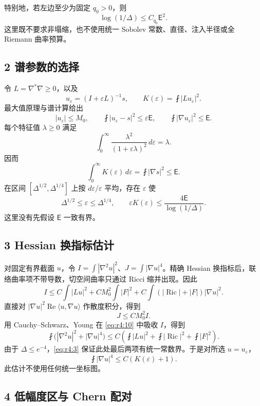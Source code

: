 \documentclass[UTF8,11pt,fontset=none]{ctexart}
\begin{document}
特别地，若左边至少为固定 \(q_0>0\)，则 \[
\boxed{
\log(1/\Delta)\le C_{q_0}\mathsf E^2.
}
\tag{4.6}\label{eq:r4:6}
\] 这里既不要求非塌缩，也不使用统一 Sobolev 常数、直径、注入半径或全 Riemann 曲率预算。

\subsection{2 谱参数的选择}\label{ch4:ux8c31ux53c2ux6570ux7684ux9009ux62e9}

令 \(L=\nabla^*\nabla\ge0\)，以及 \[
u_\varepsilon=(I+\varepsilon L)^{-1}s,
\qquad K(\varepsilon)=\fint|Lu_\varepsilon|^2.
\] 最大值原理与谱计算给出 \[
|u_\varepsilon|\le M_0,
\qquad \fint|u_\varepsilon-s|^2\le\varepsilon\mathsf E,
\qquad \fint|\nabla u_\varepsilon|^2\le\mathsf E.
\tag{4.7}\label{eq:r4:7}
\] 每个特征值 \(\lambda\ge0\) 满足 \[
\int_0^\infty\frac{\lambda^2}{(1+\varepsilon\lambda)^2}\,d\varepsilon=\lambda.
\] 因而 \[
\int_0^\infty K(\varepsilon)\,d\varepsilon
=\fint|\nabla s|^2\le\mathsf E.
\tag{4.8}\label{eq:r4:8}
\] 在区间 \([\Delta^{1/2},\Delta^{1/4}]\) 上按 \(d\varepsilon/\varepsilon\) 平均，存在 \(\varepsilon\) 使 \[
\Delta^{1/2}\le\varepsilon\le\Delta^{1/4},
\qquad
\varepsilon K(\varepsilon)\le
\frac{4\mathsf E}{\log(1/\Delta)}.
\tag{4.9}\label{eq:r4:9}
\] 这里没有先假设 \(\mathsf E\) 一致有界。

\subsection{3 Hessian 换指标估计}\label{ch4:hessian-ux6362ux6307ux6807ux4f30ux8ba1}

对固定有界截面 \(u\)，令 \(I=\int|\nabla^2u|^2\)、\(J=\int|\nabla u|^4\)。精确 Hessian 换指标后，联络曲率项不带导数，切空间曲率只通过 Ricci 缩并出现。因此 \[
I\le C\int|Lu|^2+C M_0^2\int|F|^2
+C\int(|\operatorname{Ric}|+|F|)|\nabla u|^2.
\tag{4.10}\label{eq:r4:10}
\] 直接对 \(|\nabla u|^2\operatorname{Re}\langle u,\nabla u\rangle\) 作散度积分，得到 \[
J\le C M_0^2 I.
\tag{4.11}\label{eq:r4:11}
\] 用 Cauchy--Schwarz、Young 在 \eqref{eq:r4:10} 中吸收 \(I\)，得到 \[
\fint\bigl(|\nabla^2u|^2+|\nabla u|^4\bigr)
\le C\left(\fint|Lu|^2+\fint|\operatorname{Ric}|^2+\fint|F|^2\right).
\tag{4.12}\label{eq:r4:12}
\] 由于 \(\Delta\le e^{-4}\)，\eqref{eq:r4:3} 保证此处最后两项有统一常数界。于是对所选 \(u=u_\varepsilon\)， \[
\fint|\nabla u|^4\le C(K(\varepsilon)+1).
\tag{4.13}\label{eq:r4:13}
\] 此估计不使用任何统一坐标图。

\subsection{4 低幅度区与 Chern 配对}\label{ch4:ux4f4eux5e45ux5ea6ux533aux4e0e-chern-ux914dux5bf9}
\end{document}
